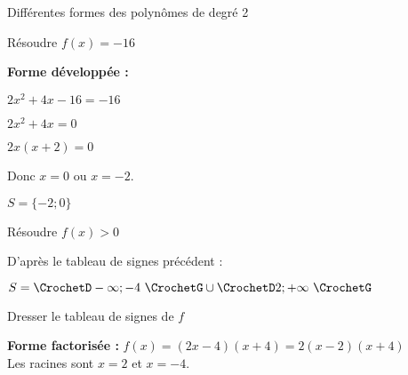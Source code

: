 \begin{EXO}{Différentes formes des polynômes de degré 2}{}
\begin{tcbenumerate}[2]
\begin{tcbenumerate}[3][1][alph]
\tcbitem[raster multicolumn=1] Résoudre $f(x)=-16$

\textbf{Forme développée :} 

$2x^2+4x-16 = -16$

$2x^2+4x = 0$

$2x(x+2) = 0$

Donc $x = 0$ ou $x = -2$.

$S = \{-2 ; 0\}$

\begin{tcbenumerate}[1][4][alph]
    \tcbitem[raster multicolumn=3] Résoudre $f(x)>0$

D'après le tableau de signes précédent :

$S = \CrochetD-\infty;-4\,\,\CrochetG \cup \CrochetD2;+\infty\,\,\CrochetG$

\end{tcbenumerate}

\tcbitem[raster multicolumn=2] Dresser le tableau de signes de $f$

\textbf{Forme factorisée :} $f(x) = (2x-4)(x+4) = 2(x-2)(x+4)$ \\

Les racines sont $x = 2$ et $x = -4$.\\

\end{tcbenumerate}
\end{tcbenumerate}

\end{EXO}
